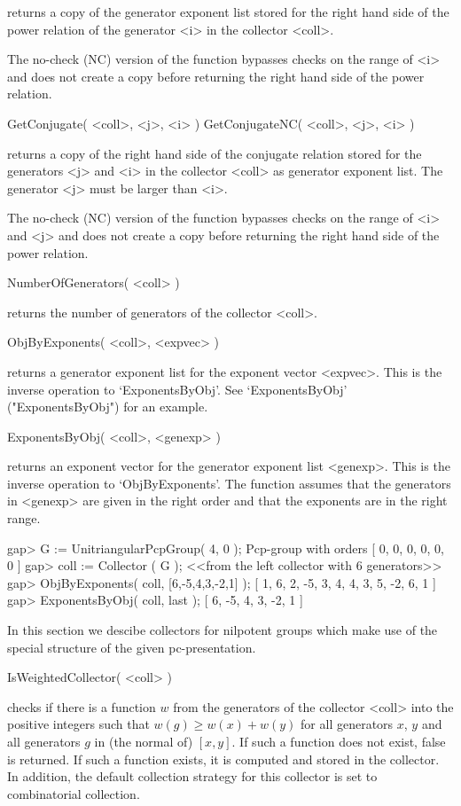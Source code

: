 returns a  copy of  the generator exponent  list stored for  the right
hand side of the power relation  of the generator <i> in the collector
<coll>.

The no-check (NC) version of the function bypasses checks on the range
of <i> and does not create a copy before returning the right hand side
of the power relation.

\>GetConjugate( <coll>, <j>, <i> )
\>GetConjugateNC( <coll>, <j>, <i> )

returns a copy of the right hand side of the conjugate relation stored
for the generators <j> and <i> in the collector <coll> as generator
exponent list.  The generator <j> must be larger than <i>.

The no-check (NC) version of the function bypasses checks on the range
of <i> and  <j> and does not create a copy  before returning the right
hand side of the power relation.

\>NumberOfGenerators( <coll> )

returns the number of generators of the collector <coll>.

\>ObjByExponents( <coll>, <expvec> )

returns a generator exponent list for the exponent vector <expvec>.
This is the inverse operation to `ExponentsByObj'.  See
`ExponentsByObj' ("ExponentsByObj") for an example.


\>ExponentsByObj( <coll>, <genexp> )

returns an exponent vector for the generator exponent list <genexp>.
This is the inverse operation to `ObjByExponents'. The function 
assumes that the generators in <genexp> are given in the right
order and that the exponents are in the right range.

\beginexample
gap> G := UnitriangularPcpGroup( 4, 0 );   
Pcp-group with orders [ 0, 0, 0, 0, 0, 0 ]
gap> coll := Collector ( G );
<<from the left collector with 6 generators>>
gap> ObjByExponents( coll, [6,-5,4,3,-2,1] );
[ 1, 6, 2, -5, 3, 4, 4, 3, 5, -2, 6, 1 ]
gap> ExponentsByObj( coll, last );
[ 6, -5, 4, 3, -2, 1 ]
\endexample



In this section we descibe collectors for nilpotent groups which make
use of the special structure of the given pc-presentation.

\>IsWeightedCollector( <coll> )

checks if there is a function $w$ from the generators of the collector
<coll> into the positive integers  such that $w(g) \geq w(x)+w(y)$ for
all  generators $x$, $y$  and all  generators $g$  in (the  normal of)
$[x,y]$.  If  such a function does  not exist, false  is returned.  If
such a  function exists, it is  computed and stored in  the collector. 
In addition, the default collection strategy for this collector is set
to combinatorial collection.

